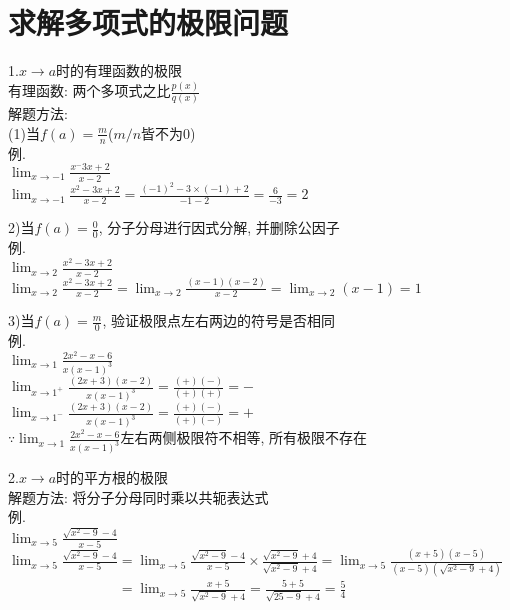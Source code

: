 \chapter{求解多项式的极限问题}
1.$x\to a$时的有理函数的极限\\
有理函数: 两个多项式之比$\frac{p(x)}{q(x)}$\\
解题方法:\\
(1)当$f(a)=\frac{m}{n}$($m/n$皆不为0)\\
例.\\
\phantom{例}$\displaystyle\lim_{x\to -1}\frac{x^-3x+2}{x-2}$\\
$\displaystyle\lim_{x\to -1}\frac{x^2-3x+2}{x-2}=\frac{(-1)^2-3\times(-1)+2}{-1-2}=\frac{6}{-3}=2$\\\vspace{1ex}

2)当$f(a)=\frac{0}{0}$, 分子分母进行因式分解, 并删除公因子\\
例.\\
\phantom{例}$\displaystyle\lim_{x\to 2}\frac{x^2-3x+2}{x-2}$\\
$\displaystyle\lim_{x\to 2}\frac{x^2-3x+2}{x-2}=\lim_{x\to 2}\frac{(x-1)(x-2)}{x-2}=\lim_{x\to 2}(x-1)=1$\\\vspace{1ex}

3)当$f(a)=\frac{m}{0}$, 验证极限点左右两边的符号是否相同\\
例.\\
\hphantom{例}$\displaystyle\lim_{x\to 1}\frac{2x^2-x-6}{x(x-1)^3}$\\
$\displaystyle\lim_{x\to 1^+}\frac{(2x+3)(x-2)}{x(x-1)^3}=\frac{(+)(-)}{(+)(+)}=-$\\
$\displaystyle\lim_{x\to 1^-}\frac{(2x+3)(x-2)}{x(x-1)^3}=\frac{(+)(-)}{(+)(-)}=+$\\
\hphantom{例}$\displaystyle\because\lim_{x\to 1}\frac{2x^2-x-6}{x(x-1)^3}$左右两侧极限符不相等, 所有极限不存在\\\vspace{4ex}

2.$x\to a$时的平方根的极限\\
解题方法: 将分子分母同时乘以共轭表达式\\
例.\\
\phantom{例}$\displaystyle\lim_{x\to 5}\frac{\sqrt{x^2-9}-4}{x-5}$\\
$\displaystyle\lim_{x\to 5}\frac{\sqrt{x^2-9}-4}{x-5}=\lim_{x\to 5}\frac{\sqrt{x^2-9}-4}{x-5}\times\frac{\sqrt{x^2-9}+4}{\sqrt{x^2-9}+4}=\lim_{x\to 5}\frac{(x+5)(x-5)}{(x-5)(\sqrt{x^2-9}+4)}$\\
\phantom{例}$\displaystyle\phantom{\lim_{x\to 5}\frac{\sqrt{x^2-9}-4}{x-5}}=\lim_{x\to 5}\frac{x+5}{\sqrt{x^2-9}+4}=\frac{5+5}{\sqrt{25-9}+4}=\frac{5}{4}$\\\vspace{4ex}

